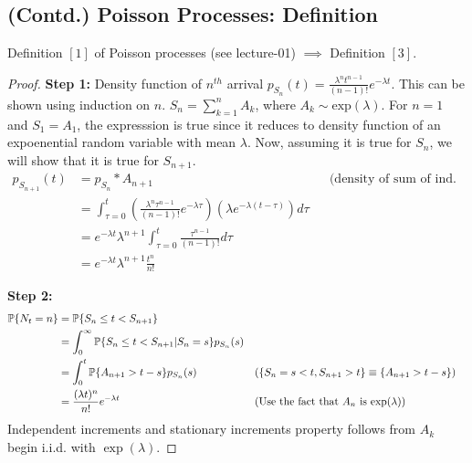 \documentclass[all-lectures.tex]{subfiles}
\author{}
\begin{document}
\setcounter{chapter}{1}
\setcounter{section}{2}

\section*{}
\chr
\setcounter{subsection}{0}
\subsection{(Contd.) Poisson Processes: Definition}
\begin{prop}[]
Definition $[1]$ of Poisson processes (see lecture-01) $\implies$ Definition $[3]$.
\begin{proof} 
\textbf{Step 1:} Density function of $n^{th}$ arrival $p_{S_n}(t) = \frac{\lambda^n t^{n-1}}{(n-1)!} e^{-\lambda t}$. This can be shown using induction on $n$. $S_n = \sum_{k=1}^n A_k$, where $A_k \sim \mathrm{exp}(\lambda)$. For $n=1$ and $S_1 = A_1$, the expresssion is true since it reduces to density function of an expoenential random variable with mean $\lambda$. Now, assuming it is true for $S_n$, we will show that it is true for $S_{n+1}$.
\begin{align*}
p_{S_{n+1}}(t) &= p_{S_n} * A_{n+1} && \text{(density of sum of ind. r.v.s is their convolution)} \\
&= \int_{\tau = 0}^{t} \left(\frac{\lambda^n \tau^{n-1}}{(n-1)!} e^{-\lambda \tau} \right) \left( \lambda e^{ - \lambda (t-\tau)} \right) d\tau \\
&=  e^{-\lambda t} \lambda^{n+1}  \int_{\tau = 0}^{t} \frac{\tau^{n-1}}{(n-1)!} d\tau \\
&=  e^{-\lambda t} \lambda^{n+1}  \frac{t^n}{n!}
\end{align*}

\textbf{Step 2:} 
\begin{align*}
\P\{N_t = n\} &= \P\{S_n \leq t < S_{n+1} \} \\
 &= \int_0^\infty \P\{S_n \leq t < S_{n+1} |S_n = s\} p_{S_n}(s) \\
 &= \int_0^t \P\{A_{n+1} > t-s\} p_{S_n}(s) &&\text{($\{S_n =  s<t, S_{n+1} > t\} \equiv \{A_{n+1} > t-s\}$)}\\
 &= 	\frac{(\lambda t)^n}{n!} e^{-\lambda t} &&\text{(Use the fact  that $A_n$ is $\mathrm{exp}(\lambda$))} \qedhere
\end{align*}
Independent increments and stationary increments property follows from $A_k$ begin i.i.d. with $\exp(\lambda)$.
\end{proof}
\end{prop}
\end{document}
